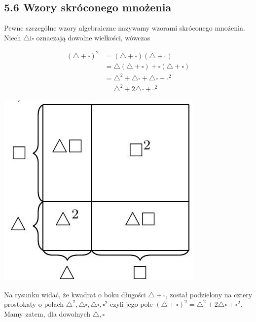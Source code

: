 \documentclass[10pt]{article}
\begin{document}
\subsection*{5.6 Wzory skróconego mnożenia}
Pewne szczególne wzory algebraiczne nazywamy wzorami skróconego mnożenia. Niech \(\triangle \mathrm{i} \square\) oznaczają dowolne wielkości, wówczas

\[
\begin{aligned}
(\triangle+\square)^{2} & =(\triangle+\square)(\triangle+\square) \\
& =\triangle(\triangle+\square)+\square(\triangle+\square) \\
& =\triangle^{2}+\triangle \square+\triangle \square+\square^{2} \\
& =\triangle^{2}+2 \triangle \square+\square^{2}
\end{aligned}
\]

\begin{center}
\includegraphics[max width=\textwidth]{2024_11_21_8f01584889ff06348ae7g-103(1)}
\end{center}

Na rysunku widać, że kwadrat o boku długości \(\triangle+\square\), został podzielony na cztery prostokaty o polach \(\triangle^{2}, \triangle \square, \triangle \square, \square^{2}\) czyli jego pole \((\triangle+\square)^{2}=\triangle^{2}+2 \triangle \square+\square^{2}\). Mamy zatem, dla dowolnych \(\triangle, \square\)
\end{document}
